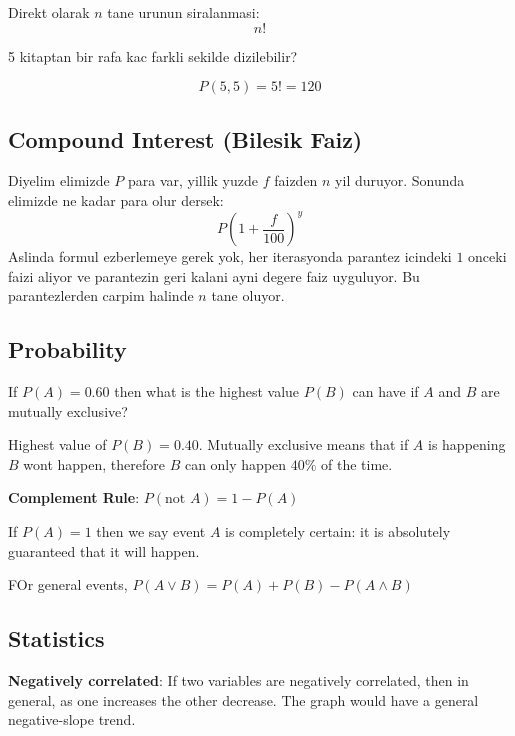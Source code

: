 \documentclass{ximera}
\begin{document}
Direkt olarak $n$ tane urunun siralanmasi: 
\begin{equation}
    n!
\end{equation}
\begin{example}
5 kitaptan bir rafa kac farkli sekilde dizilebilir?
\end{example}
\begin{explanation}
$$
P(5,5) = 5! = 120
$$
\end{explanation}
\subsection{Compound Interest (Bilesik Faiz)}
Diyelim elimizde $P$ para var, yillik yuzde $f$ faizden $n$ yil duruyor. Sonunda elimizde ne kadar para olur dersek:
\begin{equation}
    P\left(1 + \frac{f}{100}\right)^y
\end{equation}
Aslinda formul ezberlemeye gerek yok, her iterasyonda parantez icindeki $1$ onceki faizi aliyor ve parantezin geri kalani ayni degere faiz uyguluyor. Bu parantezlerden carpim halinde $n$ tane oluyor.

\subsection{Probability}
\begin{example}
If $P(A) = 0.60$ then what is the highest value $P(B)$ can have if $A$ and $B$ are mutually exclusive?
\end{example}
\begin{explanation}
Highest value of $P(B) = 0.40$. Mutually exclusive means that if $A$ is happening $B$ wont happen, therefore $B$ can only happen $40\%$ of the time.
\end{explanation}
\textbf{Complement Rule}: $P(\text{not }A) = 1 - P(A)$ \par
If $P(A) = 1$ then we say event $A$ is completely certain: it is absolutely guaranteed that it will happen.

\par

FOr general events, $P(A \lor B) = P(A) + P(B) - P(A \land B)$


\subsection{Statistics} 
\textbf{Negatively correlated}: If two variables are negatively correlated, then in general, as one increases the other decrease. The graph would have a general negative-slope trend. \par
\end{document}
